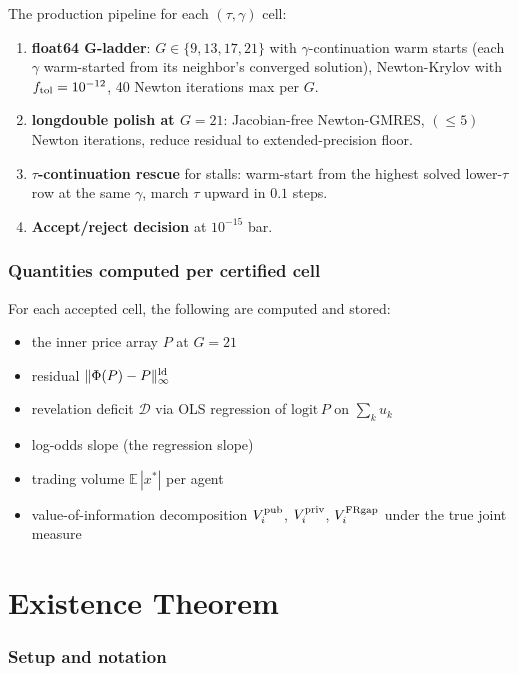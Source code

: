 \documentclass[11pt]{article}
\newcommand{\E}{\mathbb{E}}
\newcommand{\1}{\mathbf{1}}
\newcommand{\deficit}{\mathcal{D}}
\newcommand{\Vipub}{V_{i}^{\rm pub}}
\newcommand{\Vipriv}{V_{i}^{\rm priv}}
\newcommand{\ViFR}{V_{i}^{\rm FRgap}}
\begin{document}
The production pipeline for each $(\tau, \gamma)$ cell:
\begin{enumerate}
\item \textbf{float64 G-ladder}: $G \in \{9,13,17,21\}$ with
$\gamma$-continuation warm starts (each $\gamma$ warm-started from its
neighbor's converged solution), Newton-Krylov with $f_{\rm tol}=10^{-12}$,
40 Newton iterations max per $G$.
\item \textbf{longdouble polish at $G=21$}: Jacobian-free Newton-GMRES,
$(\le 5)$ Newton iterations, reduce residual to extended-precision floor.
\item \textbf{$\tau$-continuation rescue} for stalls: warm-start from the
highest solved lower-$\tau$ row at the same $\gamma$, march $\tau$
upward in $0.1$ steps.
\item \textbf{Accept/reject decision} at $10^{-15}$ bar.
\end{enumerate}

\section{Quantities computed per certified cell}

For each accepted cell, the following are computed and stored:
\begin{itemize}
\item the inner price array $P$ at $G=21$
\item residual $\|\Phi(P)-P\|_\infty^{\rm ld}$
\item revelation deficit $\deficit$ via OLS regression of $\mathrm{logit}\,P$
on $\sum_k u_k$
\item log-odds slope (the regression slope)
\item trading volume $\E\,|x^*|$ per agent
\item value-of-information decomposition $\Vipub$, $\Vipriv$, $\ViFR$
under the true joint measure
\end{itemize}

\part{Existence Theorem}

\section{Setup and notation}
\end{document}
